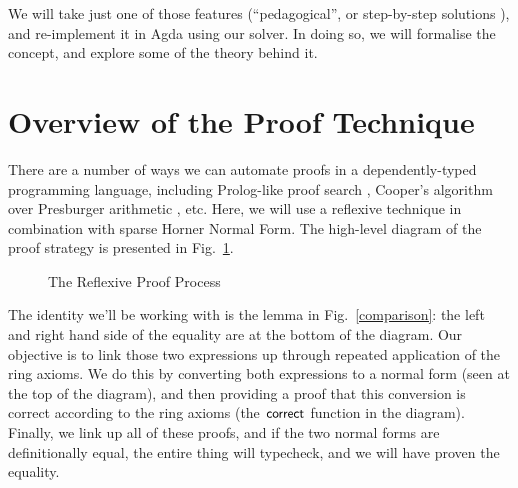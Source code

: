\documentclass[acmsmall,review,anonymous]{acmart}\settopmatter{printfolios=true,printccs=false,printacmref=false}
\begin{document}
\begin{description}
    We will take just one of those features (``pedagogical'', or step-by-step
    solutions \cite{the_development_team_step-by-step_2009}), and re-implement
    it in Agda using our solver. In doing so, we will formalise the concept, and
    explore some of the theory behind it. 
\end{description}

\section{Overview of the Proof Technique}
There are a number of ways we can automate proofs in a dependently-typed
programming language, including Prolog-like proof search \cite{kokke_auto_2015},
Cooper's algorithm over Presburger arithmetic \cite{allais_deciding_2011}, etc.
Here, we will use a reflexive technique \cite{boutin_using_1997} in combination
with sparse Horner Normal Form. The high-level diagram of the proof strategy is
presented in Fig.~\ref{proof-process}.

\begin{figure}
  \vspace*{-50pt}
  \caption{The Reflexive Proof Process}
  \label{proof-process}
\end{figure}

The identity we'll be working with is the lemma in Fig.~\ref{comparison}: the
left and right hand side of the equality are at the bottom of the diagram. Our
objective is to link those two expressions up through repeated application of
the ring axioms. We do this by converting both expressions to a normal form
(seen at the top of the diagram), and then providing a proof that this
conversion is correct according to the ring axioms (the
\(\AgdaFunction{correct}\) function in the diagram). Finally, we link up all of
these proofs, and if the two normal forms are definitionally equal, the entire
thing will typecheck, and we will have proven the equality.
\end{document}
